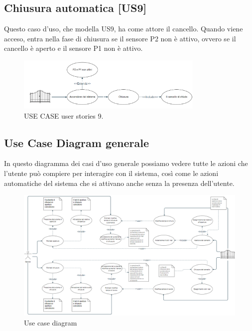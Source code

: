 \documentclass[12pt]{article}
\begin{document}
\subsection{Chiusura automatica [US9]}
Questo caso d'uso, che modella US9, ha come attore il cancello. Quando viene acceso, entra nella fase di chiusura se il sensore P2 non è attivo, ovvero se il cancello è aperto e il sensore P1 non è attivo.
    \begin{figure}[H]
        \centering
        \includegraphics[width=0.8\textwidth]{use_case_us9.PNG}
        \caption{USE CASE user stories 9.}
        \label{fig:use_case_us9}
    \end{figure}
\newpage
\begin{landscape}
\subsection{Use Case Diagram generale}
In questo diagramma dei casi d'uso generale possiamo vedere tutte le azioni che l'utente può compiere per interagire con il sistema, così come le azioni automatiche del sistema che si attivano anche senza la presenza dell'utente.
\begin{figure}[H] %
    \centering %
    \includegraphics[width=1.35\textwidth]{usa_case_diagram.PNG} %
    \caption{Use case diagram} %
    \label{fig:General Use Case Diagram} %
\end{figure}
\end{landscape}
\end{document}
